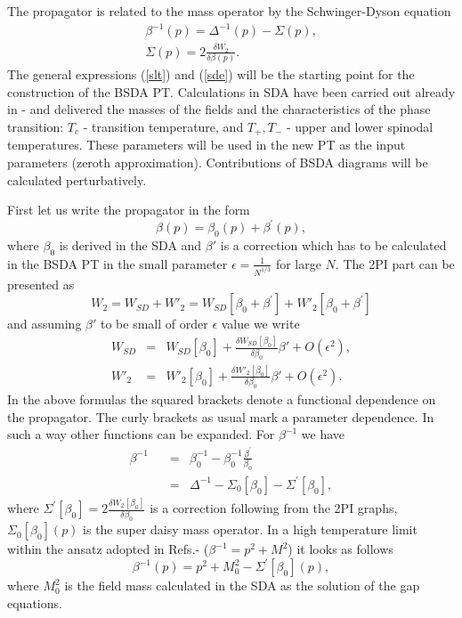 \documentclass[a4paper,12pt]{article}
\begin{document}
The propagator is related to the mass operator by the Schwinger-Dyson
equation
\begin{eqnarray} \label{sde}
\beta^{-1}(p) = \Delta^{-1}(p) - \Sigma(p),\\
\Sigma(p) = 2 \frac{\delta W_2}{\delta \beta(p)}.~~~~~~~~~~ 
\end{eqnarray} 
The general expressions (\ref{slt}) and (\ref{sde}) will be the starting
point for the construction of the BSDA PT. Calculations in SDA have
been carried out already in \cite{prd}-\cite{pl} and delivered 
the masses of the fields and the characteristics of the phase transition:
$T_c$ - transition temperature, and $ T_+, T_-$ - upper and lower
spinodal temperatures. These parameters will be used in the new PT as
the input parameters (zeroth approximation). Contributions of BSDA
diagrams will be calculated perturbatively.

First let us write the propagator in the form
\begin{equation} \label{fp}
\beta(p) = \beta_0(p) + \beta^{'}(p),
\end{equation}
where  $\beta_0$ is derived in the SDA and
 $\beta{'}$ is a correction  which has to be calculated
in the BSDA PT in the small parameter $\epsilon = \frac{1}{N^{1/3}}$
for large $N$. The 2PI  part can be presented as 
\begin{equation} \label{w2}
W_2 = W_{SD} + W'_2 = W_{SD}[\beta_0 + \beta^{'}]  + W'_2[\beta_0 +
\beta^{'}]
\end{equation}
and assuming $\beta{'}$ to be small of order $\epsilon$ value we write
\begin{eqnarray} \label{expansion}
W_{SD} &=& W_{SD}[\beta_0] + \frac{\delta
W_{SD}[\beta_0]}{\delta\beta_0} \beta{'} + O(\epsilon^2),\\
  W'_{2} &=& W'_{2}[\beta_0] + \frac{\delta
W'_{2}[\beta_0]}{\delta\beta_0} \beta{'} + O(\epsilon^2).
\end{eqnarray}
In the above formulas the squared brackets denote a functional
dependence on the propagator. The curly brackets as usual mark a
parameter dependence.  In such a way other functions can be
expanded. For $\beta^{-1}$ we have
\begin{eqnarray} \label{bet}
\beta^{-1} &=& \beta_0^{-1} - \beta_0^{-1}\frac{\beta^{'}}{\beta_0}~~~~~~~~~~\\
~~~~~~~~~~~&=& \Delta^{-1} - \Sigma_0[\beta_0] - \Sigma^{'}[\beta_0],
\end{eqnarray}
where $\Sigma^{'}[\beta_0] = 2 \frac{\delta W_2[\beta_0]}{\delta
\beta_0}$ is a correction following from the 2PI graphs,
$\Sigma_0[\beta_0](p)$ is the super daisy mass operator. In a high
temperature limit within the ansatz adopted in
Refs.\cite{Bordag1}-\cite{pl} ($\beta^{-1} = p^2 + M^2$) it looks as
follows
\begin{equation} \label{be'}
\beta^{-1}(p) =  p^2 + M^2_0 - \Sigma^{'}[\beta_0](p),
\end{equation}
where $ M^2_0$ is the field mass calculated in the SDA as the solution
of the gap equations.
\end{document}
